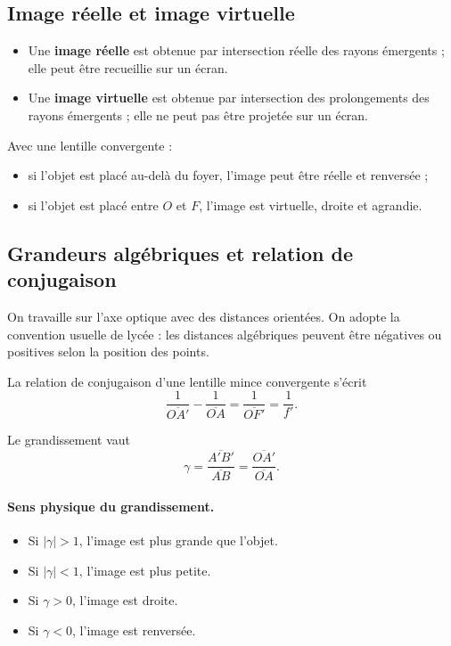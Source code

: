\documentclass[11pt,a4paper]{article}
\begin{document}
\subsection{Image réelle et image virtuelle}

\begin{definitionbox}
\begin{itemize}
    \item Une \textbf{image réelle} est obtenue par intersection réelle des rayons émergents ; elle peut être recueillie sur un écran.
    \item Une \textbf{image virtuelle} est obtenue par intersection des prolongements des rayons émergents ; elle ne peut pas être projetée sur un écran.
\end{itemize}
\end{definitionbox}

\begin{propriete}
Avec une lentille convergente :
\begin{itemize}
    \item si l'objet est placé au-delà du foyer, l'image peut être réelle et renversée ;
    \item si l'objet est placé entre $O$ et $F$, l'image est virtuelle, droite et agrandie.
\end{itemize}
\end{propriete}

\subsection{Grandeurs algébriques et relation de conjugaison}
On travaille sur l'axe optique avec des distances orientées. On adopte la convention usuelle de lycée : les distances algébriques peuvent être négatives ou positives selon la position des points.

\begin{propriete}
La relation de conjugaison d'une lentille mince convergente s'écrit
\[
\frac{1}{\overline{OA'}}-\frac{1}{\overline{OA}}=\frac{1}{\overline{OF'}}=\frac{1}{f'}.
\]
\end{propriete}

\begin{propriete}
Le grandissement vaut
\[
\gamma = \frac{\overline{A'B'}}{\overline{AB}} = \frac{\overline{OA'}}{\overline{OA}}.
\]
\end{propriete}

\paragraph{Sens physique du grandissement.}
\begin{itemize}
    \item Si $|\gamma|>1$, l'image est plus grande que l'objet.
    \item Si $|\gamma|<1$, l'image est plus petite.
    \item Si $\gamma>0$, l'image est droite.
    \item Si $\gamma<0$, l'image est renversée.
\end{itemize}
\end{document}

